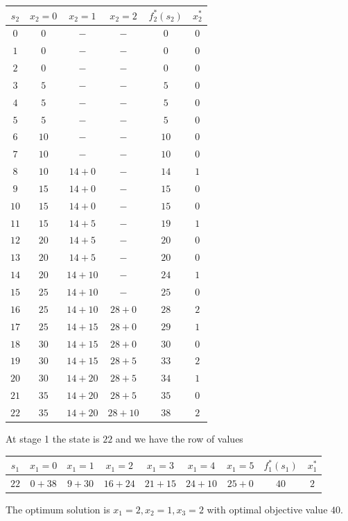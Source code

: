 \documentclass{article}[12pt,a4paper]
\begin{document}
\begin{enumerate}
\begin{multicols}{2}
  \columnbreak
  
  \begin{center}
  \begin{tabular}{c | c c c | c | c}
  $s_2$ & $x_2 = 0$ & $x_2 = 1$ & $x_2 = 2$ & $f_2^*(s_2)$ & $x_2^*$ \\
  \hline
  $0$ & $0$ & $-$ & $-$ & $0$ & $0$ \\
  $1$ & $0$ &$-$ & $-$ & $0$ & $0$ \\
  $2$ & $0$ & $-$ & $-$ & $0$ & $0$ \\
  $3$ & $5$ & $-$ & $-$ & $5$ & $0$ \\
  $4$ & $5$ & $-$ & $-$ & $5$ & $0$ \\
  $5$ & $5$ & $-$ & $-$ & $5$ & $0$ \\
  $6$ & $10$ & $-$ & $-$ & $10$ & $0$ \\
  $7$ & $10$ & $-$ & $-$ & $10$ & $0$ \\
  $8$ & $10$ & $14 + 0$ & $-$ & $14$ & $1$ \\
  $9$ & $15$& $14 + 0$ & $-$ & $15$ & $0$ \\
  $10$ & $15$ & $14 + 0$ & $-$ & $15$ & $0$ \\
  $11$ & $15$ & $14 + 5$ & $-$ & $19$ & $1$ \\
  $12$ & $20$ & $14 + 5$ & $-$ & $20$ & $0$ \\
  $13$ & $20$ & $14 + 5$ & $-$ & $20$ & $0$ \\
  $14$ & $20$ & $14 + 10$ & $-$ & $24$ & $1$ \\
  $15$ & $25$ & $14 + 10$ & $-$ & $25$ & $0$ \\
  $16$ & $25$ & $14 + 10$ & $28 + 0$ & $28$ & $2$  \\
  $17$ & $25$ & $14 + 15$ & $28 + 0$ & $29$ & $1$ \\
  $18$ & $30$ & $14 + 15$ & $28 + 0$ & $30$ & $0$ \\
  $19$ & $30$ & $14 + 15$ & $28 + 5$ & $33$ & $2$ \\
  $20$ & $30$ & $14 + 20$ & $28 + 5$ & $34$ & $1$ \\
  $21$ & $35$ & $14 + 20$ & $28 + 5$ & $35$ & $0$ \\
  $22$ & $35$ & $14 + 20$ & $28 + 10$ & $38$ & $2$ \\
  \end{tabular}
  \end{center}
  \end{multicols}
  
  At stage 1 the state is $22$ and we have the row of values
  \begin{center}
  \begin{tabular}{c | c c c c c c | c | c}
  $s_1$ & $x_1 = 0$ & $x_1 = 1$ & $x_1 = 2$ & $x_1 = 3$ & $x_1 = 4$ & $x_1 = 5$ & $f_1^*(s_1)$ & $x_1^*$ \\
  \hline
  $22$ & $0 + 38$ & $9 + 30$ & $16 + 24$ & $21 + 15$ & $24 + 10$ & $25+ 0$ & $40$ & $2$
  \end{tabular}
  \end{center}
  The optimum solution is $x_1 = 2, x_2 = 1, x_3 = 2$ with optimal objective value $40$. \newline
  

\end{enumerate}
\end{document}
